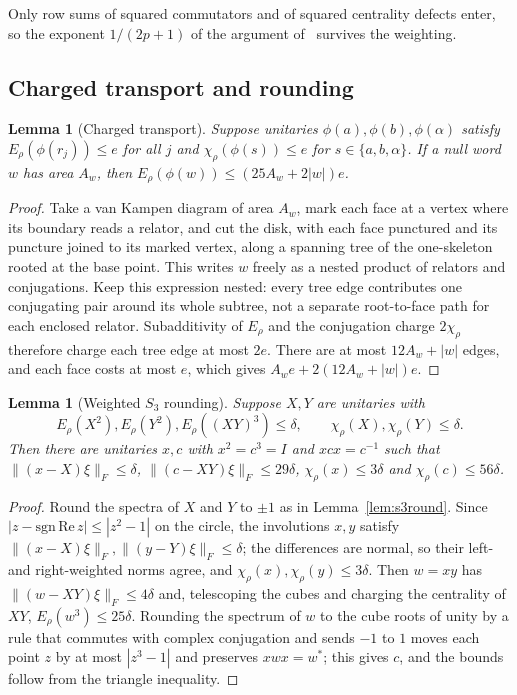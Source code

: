 \documentclass[11pt,a4paper]{article}
\theoremstyle{plain}
\newtheorem{lemma}[theorem]{Lemma}
\theoremstyle{definition}
\theoremstyle{remark}
\begin{document}
Only row sums of squared commutators and of squared centrality defects enter, so the exponent $1/(2p+1)$ of
the argument of~\cite[Section~4]{DouglasMghirbiA} survives the weighting.

\subsection{Charged transport and rounding}

\begin{lemma}[Charged transport]\label{lem:charged}
Suppose unitaries $\phi(a),\phi(b),\phi(\alpha)$ satisfy $E_\rho(\phi(r_j))\le e$ for all $j$ and $\chi_\rho(\phi(s))\le e$ for
$s\in\{a,b,\alpha\}$. If a null word $w$ has area $A_w$, then $E_\rho(\phi(w))\le(25A_w+2|w|)e$.
\end{lemma}

\begin{proof}
Take a van Kampen diagram of area $A_w$, mark each face at a vertex where its boundary reads a relator, and cut the disk, with each
face punctured and its puncture joined to its marked vertex, along a spanning tree of the one-skeleton rooted at the base point. This
writes $w$ freely as a nested product of relators and conjugations. Keep this expression nested: every tree edge contributes one
conjugating pair around its whole subtree, not a separate root-to-face path for each enclosed relator. Subadditivity of $E_\rho$ and
the conjugation charge $2\chi_\rho$ therefore charge each tree edge at most $2e$. There are at most $12A_w+|w|$ edges, and each face
costs at most $e$, which gives
$A_we+2(12A_w+|w|)e$.
\end{proof}

\begin{lemma}[Weighted $S_3$ rounding]\label{lem:weighted-round}
Suppose $X,Y$ are unitaries with
\[
E_\rho(X^2),E_\rho(Y^2),E_\rho((XY)^3)\le\delta,
\qquad \chi_\rho(X),\chi_\rho(Y)\le\delta.
\]
Then there are unitaries $x,c$ with
$x^2=c^3=I$ and $xcx=c^{-1}$ such that $\|(x-X)\xi\|_F\le\delta$, $\|(c-XY)\xi\|_F\le29\delta$, $\chi_\rho(x)\le3\delta$ and
$\chi_\rho(c)\le56\delta$.
\end{lemma}

\begin{proof}
Round the spectra of $X$ and $Y$ to $\pm1$ as in Lemma~\ref{lem:s3round}. Since $|z-\mathrm{sgn}\,\mathrm{Re}\,z|\le|z^2-1|$ on the circle,
the involutions $x,y$ satisfy $\|(x-X)\xi\|_F,\|(y-Y)\xi\|_F\le\delta$; the differences are normal, so their left- and right-weighted
norms agree, and $\chi_\rho(x),\chi_\rho(y)\le3\delta$. Then $w=xy$ has $\|(w-XY)\xi\|_F\le4\delta$ and, telescoping the cubes and charging
the centrality of $XY$, $E_\rho(w^3)\le25\delta$. Rounding the spectrum of $w$ to the cube roots of unity by a rule that commutes with
complex conjugation and sends $-1$ to $1$ moves each point $z$ by at most $|z^3-1|$ and preserves $xwx=w^*$; this gives $c$, and the
bounds follow from the triangle inequality.
\end{proof}
\end{document}
